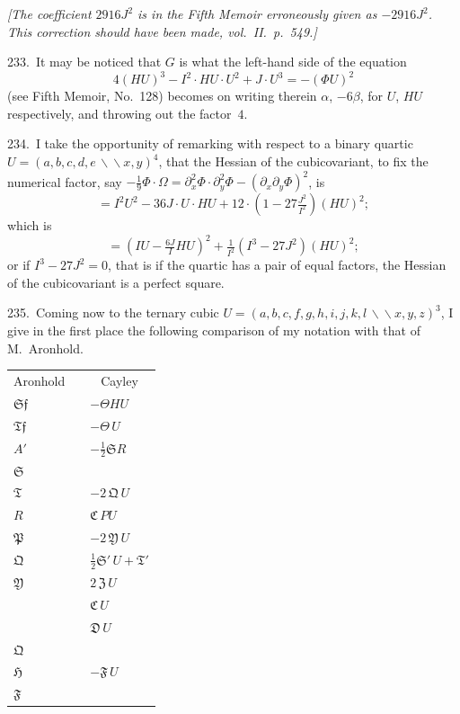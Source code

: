 \documentclass[11pt,a4paper]{book}
\begin{document}
\medskip
\textit{[The coefficient $2916J^2$ is in the Fifth Memoir erroneously given as $-2916J^2$. This correction should have been made, vol.~II.\ p.~549.]}

\newpage
\setcounter{page}{331}

233.\ It may be noticed that $G$ is what the left-hand side of the equation
\[
4(HU)^3-I^2\cdot HU\cdot U^2+J\cdot U^3 = -(\Phi U)^2
\]
(see Fifth Memoir, No.~128) becomes on writing therein $\alpha$, $-6\beta$, for $U$, $HU$ respectively, and throwing out the factor~$4$.

234.\ I take the opportunity of remarking with respect to a binary quartic $U=(a,b,c,d,e\,\backslash\!\!\backslash x,y)^4$, that the Hessian of the cubicovariant, to fix the numerical factor, say $-\tfrac{1}{9}\Phi\cdot\Omega = \partial_x^2\Phi\cdot\partial_y^2\Phi-(\partial_x\partial_y\Phi)^2$, is
\[
= I^2U^2-36J\cdot U\cdot HU+12\cdot(1-27\tfrac{J^2}{I^2})(HU)^2;
\]
which is
\[
= (IU-\tfrac{6J}{I}HU)^2+\tfrac{1}{I^2}(I^3-27J^2)(HU)^2;
\]
or if $I^3-27J^2=0$, that is if the quartic has a pair of equal factors, the Hessian of the cubicovariant is a perfect square.

235.\ Coming now to the ternary cubic $U=(a,b,c,f,g,h,i,j,k,l\,\backslash\!\!\backslash x,y,z)^3$, I give in the first place the following comparison of my notation with that of M.~Aronhold.

\begin{center}
\begin{tabular}{lcl}
\multicolumn{1}{c}{Aronhold} & \hspace{2cm} & \multicolumn{1}{c}{Cayley}\\
\addlinespace
$\mathfrak{S}\mathfrak{f}$ & & $-\Theta HU$ \\
$\mathfrak{T}\mathfrak{f}$ & & $-\Theta\,U$ \\
$A'$ & & $-\tfrac{1}{2}\mathfrak{S}R$ \\
$\mathfrak{S}$ & & \\
$\mathfrak{T}$ & & $-2\,\mathfrak{Q}\,U$ \\
$R$ & & $\mathfrak{C}\,PU$ \\
$\mathfrak{P}$ & & $-2\,\mathfrak{Y}\,U$ \\
$\mathfrak{Q}$ & & $\tfrac{1}{2}\mathfrak{S}'\,U+\mathfrak{T}'$ \\
$\mathfrak{Y}$ & & $2\,\mathfrak{Z}\,U$ \\
\addlinespace
& & $\mathfrak{C}\,U$ \\
& & $\mathfrak{D}\,U$ \\
$\mathfrak{Q}$ & & \\
$\mathfrak{H}$ & & $-\mathfrak{F}\,U$ \\
$\mathfrak{F}$ & & \\
\end{tabular}
\end{center}
\end{document}
